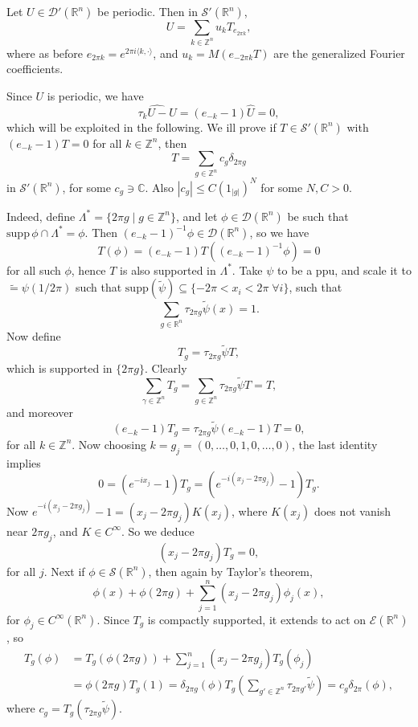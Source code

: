 \documentclass[12pt]{article}
\begin{document}
\begin{theorem}
	Let $U \in \mathcal{D}'(\mathbb{R}^n)$ be periodic. Then in $\mathcal{S}'(\mathbb{R}^n)$,
	\[
	U = \sum_{k \in \mathbb{Z}^n} u_k T_{e_{2\pi k}},
	\]
	where as before $e_{2\pi k} = e^{2\pi i \langle k, \cdot \rangle}$, and $u_k = M(e_{-2\pi k} T)$ are the generalized Fourier coefficients.
\end{theorem}

\begin{proofbox}
	Since $U$ is periodic, we have
	\[
		\widehat{\tau_k U - U} = (e_{-k} - 1) \hat U = 0,
	\]
	which will be exploited in the following. We ill prove if $T \in \mathcal{S}'(\mathbb{R}^n)$ with $(e_{-k} - 1)T = 0$ for all $k \in \mathbb{Z}^n$, then
	\[
	T = \sum_{g \in \mathbb{Z}^n} c_g \delta_{2\pi g}
	\]
	in $\mathcal{S}'(\mathbb{R}^n)$, for some $c_g \ni \mathbb{C}$. Also $|c_g| \leq C (1_|g|)^N$ for some $N, C > 0$.

	Indeed, define $\Lambda^\ast = \{2 \pi g \mid g \in \mathbb{Z}^n\}$, and let $\phi \in \mathcal{D}(\mathbb{R}^n)$ be such that $\mathrm{supp}\, \phi \cap \Lambda^\ast = \phi$. Then $(e_{-k} - 1)^{-1} \phi \in \mathcal{D}(\mathbb{R}^n)$, so we have
	\[
	T(\phi) = (e_{-k} - 1) T((e_{-k} - 1)^{-1} \phi) = 0
	\]
	for all such $\phi$, hence $T$ is also supported in $\Lambda^\ast$. Take $\psi$ to be a ppu, and scale it to $\tilde = \psi(1/2\pi)$ such that $\mathrm{supp}(\tilde \psi) \subseteq \{-2\pi < x_i < 2 \pi \; \forall i\}$, such that
	\[
	\sum_{g \in \mathbb{R}^n} \tau_{2\pi g} \tilde \psi(x) = 1.
	\]
	Now define
	\[
	T_g = \tau_{2 \pi g} \tilde \psi T,
	\]
	which is supported in $\{2 \pi g\}$. Clearly
	\[
	\sum_{\gamma \in \mathbb{Z}^n} T_g = \sum_{g \in \mathbb{Z}^n} \tau_{2\pi g} \tilde \psi T = T,
	\]
	and moreover
	\[
		(e_{-k} - 1)T_g = \tau_{2\pi g} \tilde \psi (e_{-k} - 1)T = 0,
	\]
	for all $k \in \mathbb{Z}^n$. Now choosing $k = g_j = (0, \ldots, 0, 1, 0, \ldots, 0)$, the last identity implies
	\[
	0 = (e^{-i x_j} - 1) T_g = (e^{-i(x_j - 2\pi g_j)} - 1)T_g.
	\]
	Now $e^{-i(x_j - 2\pi g_j)} - 1 = (x_j - 2\pi g_j) K(x_j)$, where $K(x_j)$ does not vanish near $2 \pi g_j$, and $K \in C^\infty$. So we deduce
	\[
		(x_j - 2 \pi g_j) T_g = 0,
	\]
	for all $j$. Next if $\phi \in \mathcal{S}(\mathbb{R}^n)$, then again by Taylor's theorem,
	\[
	\phi(x) + \phi(2 \pi g) + \sum_{j = 1}^n (x_j - 2 \pi g_j) \phi_j(x),
	\]
	for $\phi_j \in C^\infty(\mathbb{R}^n)$. Since $T_g$ is compactly supported, it extends to act on $\mathcal{E}(\mathbb{R}^n)$, so
	\begin{align*}
		T_g(\phi) &= T_g(\phi(2 \pi g)) + \sum_{j = 1}^n (x_j - 2\pi g_j) T_g(\phi_j) \\
			  &= \phi(2 \pi g) T_g(1) = \delta_{2 \pi g} (\phi) T_g \left( \sum_{g' \in \mathbb{Z}^n} \tau_{2 \pi g'} \tilde \psi \right) = c_g \delta_{2 \pi}(\phi),
	\end{align*}
	where $c_g = T_g(\tau_{2 \pi g} \tilde \psi)$.


\end{proofbox}
\end{document}
